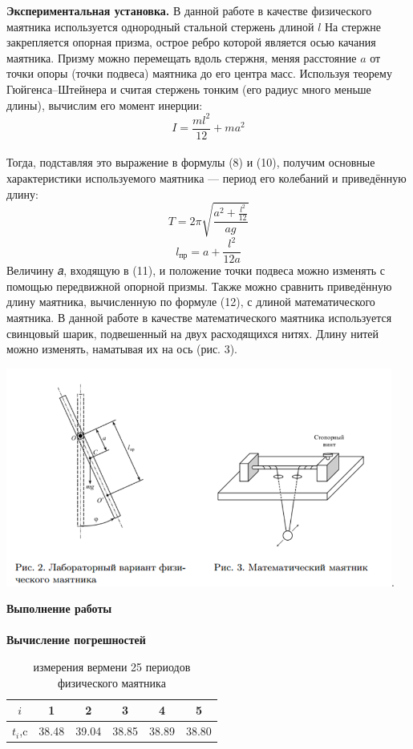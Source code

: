 \documentclass[12pt]{article}
\begin{document}

    \textbf{Экспериментальная установка.}
    В данной работе в качестве физического маятника используется однородный стальной стержень длиной
    $l$  На стержне закрепляется опорная призма, острое ребро
    которой является осью качания маятника. Призму можно перемещать
    вдоль стержня, меняя расстояние $a$ от точки опоры (точки подвеса)
    маятника до его центра масс. Используя теорему Гюйгенса–Штейнера 
    и считая стержень тонким (его радиус много
    меньше длины), вычислим его момент инерции: $$I = \frac{ml^2}{12} + ma^2$$
    \\
    Тогда, подставляя это выражение в формулы (8) и (10), получим основные характеристики используемого маятника — период его колебаний
    и приведённую длину:
    \begin{equation}
    T = 2\pi\sqrt{\frac{a^2+\frac{l^2}{12}}{ag}}
    \end{equation}
    \begin{equation}
    l_{пр} = a+\frac{l^2}{12a}
    \end{equation}
    Величину 𝑎, входящую в (11), и положение точки подвеса можно изменять с помощью передвижной опорной призмы. Также можно сравнить приведённую длину маятника, вычисленную по формуле (12), с
    длиной математического маятника. В данной работе в качестве математического маятника используется свинцовый шарик, подвешенный на двух расходящихся нитях. Длину нитей можно изменять, наматывая их
    на ось (рис. 3).
    \begin{center} 
    	\includegraphics[width=5in]{lab3_2.png}.
    \end{center}
    \pagebreak
    \textbf{\large Выполнение работы} \\\\
    \textbf{Вычисление погрешностей}
       \begin{table}[ht]
       	\caption{измерения вермени 25 периодов физического маятника}
       	\begin{center}
       		\begin{tabular}{|c|c|c|c|c|c|}
       			\hline 
       			$i$ & 1 & 2 & 3 & 4 & 5 \\
       			\hline
       			$t_i$,c & 38.48 & 39.04 & 38.85 & 38.89 & 38.80 \\
       			\hline
       		\end{tabular}
       	\end{center}
       \end{table}
       
\end{document}

